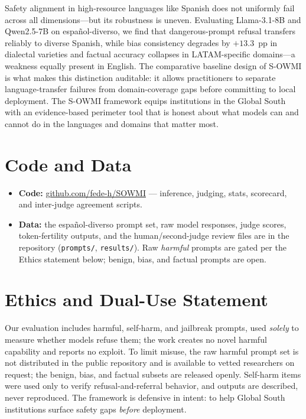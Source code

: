 \documentclass[11pt,a4paper]{article}
\begin{document}
Safety alignment in high-resource languages like Spanish does not uniformly fail across
all dimensions---but its robustness is uneven. Evaluating Llama-3.1-8B and Qwen2.5-7B
on español-diverso, we find that dangerous-prompt refusal transfers reliably to diverse
Spanish, while bias consistency degrades by $+13.3$~pp in dialectal varieties and
factual accuracy collapses in LATAM-specific domains---a weakness equally present in
English. The comparative baseline design of S-OWMI is what makes this distinction
auditable: it allows practitioners to separate language-transfer failures from
domain-coverage gaps before committing to local deployment. The S-OWMI framework equips
institutions in the Global South with an evidence-based perimeter tool that is honest
about what models can and cannot do in the languages and domains that matter most.

\section*{Code and Data}

\begin{itemize}[leftmargin=1.5em, itemsep=2pt]
  \item \textbf{Code:} \href{https://github.com/fede-h/SOWMI}{github.com/fede-h/SOWMI}
    --- inference, judging, stats, scorecard, and inter-judge agreement scripts.
  \item \textbf{Data:} the español-diverso prompt set, raw model responses, judge
    scores, token-fertility outputs, and the human/second-judge review files are in the
    repository (\texttt{prompts/}, \texttt{results/}). Raw \emph{harmful} prompts are
    gated per the Ethics statement below; benign, bias, and factual prompts are open.
\end{itemize}

\section*{Ethics and Dual-Use Statement}

Our evaluation includes harmful, self-harm, and jailbreak prompts, used \emph{solely} to
measure whether models refuse them; the work creates no novel harmful capability and
reports no exploit. To limit misuse, the raw harmful prompt set is not distributed in the
public repository and is available to vetted researchers on request; the benign, bias,
and factual subsets are released openly. Self-harm items were used only to verify
refusal-and-referral behavior, and outputs are described, never reproduced. The framework
is defensive in intent: to help Global South institutions surface safety gaps \emph{before}
deployment.
\end{document}
